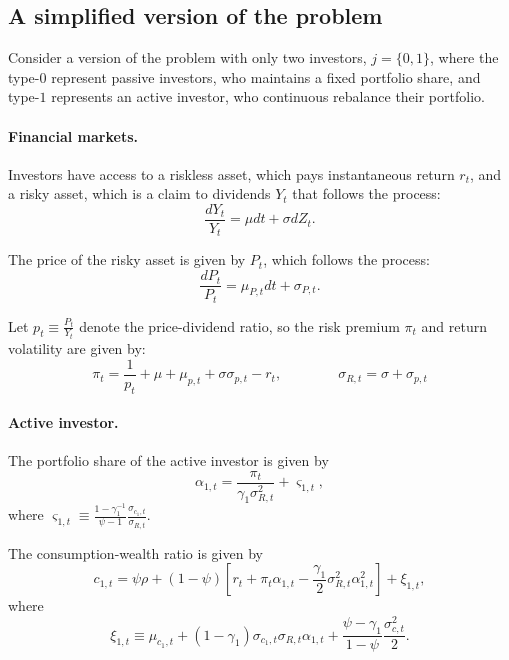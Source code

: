 \documentclass[11pt,english]{article}
\begin{document}
\subsection{A simplified version of the problem}

Consider a version of the problem with only two investors, $j = \{0,1\}$, where the type-$0$ represent passive investors, who maintains a fixed portfolio share, and type-$1$ represents an active investor, who continuous rebalance their portfolio.

\paragraph{Financial markets.} Investors have access to a riskless asset, which pays instantaneous return $r_t$, and a risky asset, which is a claim to dividends $Y_t$ that follows the process:
\begin{equation}
    \frac{d Y_t}{Y_t} = \mu dt + \sigma d Z_t.
\end{equation}

The price of the risky asset is given by $P_t$, which follows the process:
\begin{equation}
    \frac{d P_{t}}{P_t} = \mu_{P,t} dt + \sigma_{P,t}.
\end{equation}

Let $p_t \equiv \frac{P_t}{Y_t}$ denote the price-dividend ratio, so the risk premium $\pi_t$ and return volatility are given by:
\begin{equation}
    \pi_t = \frac{1}{p_t} + \mu+\mu_{p,t} + \sigma \sigma_{p,t}  - r_t, \qquad \qquad
    \sigma_{R,t} = \sigma +\sigma_{p,t}
\end{equation}

\paragraph{Active investor.} The portfolio share of the active investor is given by
\begin{equation}
    \alpha_{1,t} = \frac{\pi_t}{\gamma_1 \sigma_{R,t}^2} + \varsigma_{1,t},
\end{equation}
where $\varsigma_{1,t} \equiv \frac{1-\gamma_1^{-1}}{\psi-1} \frac{\sigma_{c_1,t}}{\sigma_{R,t}}$.

The consumption-wealth ratio is given by
\begin{equation}
    c_{1,t} = \psi \rho + (1-\psi) \left[ r_t + \pi_t \alpha_{1,t} - \frac{\gamma_1}{2} \sigma_{R,t}^2 \alpha_{1,t}^2 \right] + \xi_{1,t},
\end{equation}
where
\begin{equation}
    \xi_{1,t} \equiv \mu_{c_1,t} + (1-\gamma_1) \sigma_{c_1,t} \sigma_{R,t} \alpha_{1,t} + \frac{\psi-\gamma_1}{1-\psi} \frac{\sigma_{c,t}^2}{2}.
\end{equation}
\end{document}
